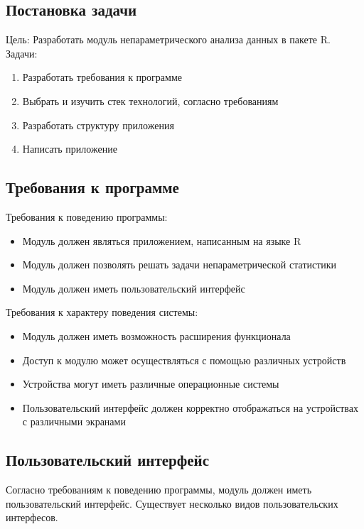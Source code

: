 \documentclass[14pt,a4paper]{scrartcl}
\begin{document}
    \subsection{Постановка задачи}
    \noindent Цель: Разработать модуль непараметрического анализа данных в пакете R.
	\noindent Задачи:
    \begin{enumerate}
        \item Разработать требования к программе
        \item Выбрать и изучить стек технологий, согласно требованиям
        \item Разработать структуру приложения
        \item Написать приложение
    \end{enumerate}

    \subsection{Требования к программе}
    Требования к поведению программы:
    \begin{itemize}
        \item Модуль должен являться приложением, написанным на языке R
        \item Модуль должен позволять решать задачи непараметрической статистики
        \item Модуль должен иметь пользовательский интерфейс
    \end{itemize}

    Требования к характеру поведения системы:
    \begin{itemize}
        \item Модуль должен иметь возможность расширения функционала
        \item Доступ к модулю может осуществляться с помощью различных устройств
        \item Устройства могут иметь различные операционные системы
        \item Пользовательский интерфейс должен корректно отображаться на устройствах с различными экранами
    \end{itemize}

    \subsection{Пользовательский интерфейс}
    Согласно требованиям к поведению программы, модуль должен иметь пользовательский интерфейс. Существует несколько видов пользовательских интерфесов.
\end{document}
